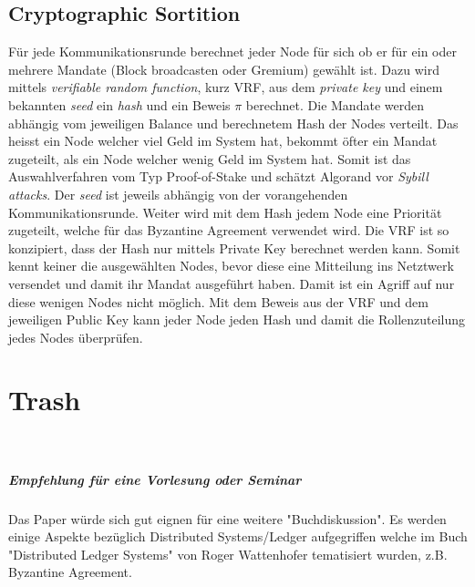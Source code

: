 \documentclass[11pt,a4paper]{article}
\begin{document}
\section*{Cryptographic Sortition}
F\"ur jede Kommunikationsrunde berechnet jeder Node f\"ur sich ob er f\"ur ein oder mehrere Mandate (Block broadcasten oder Gremium) gew\"ahlt ist.
Dazu wird mittels \textit{verifiable random function}, kurz VRF, aus dem \textit{private key} und einem bekannten \textit{seed} ein \textit{hash} und ein Beweis $\pi$ berechnet.
Die Mandate werden abh\"angig vom jeweiligen Balance und berechnetem Hash der Nodes verteilt.
Das heisst ein Node welcher viel Geld im System hat, bekommt \"ofter ein Mandat zugeteilt, als ein Node welcher wenig Geld im System hat.
Somit ist das Auswahlverfahren vom Typ Proof-of-Stake und schätzt Algorand vor \textit{Sybill attacks}.
Der \textit{seed} ist jeweils abh\"angig von der vorangehenden Kommunikationsrunde.
Weiter wird mit dem Hash jedem Node eine Priorit\"at zugeteilt, welche f\"ur das Byzantine Agreement verwendet wird.
Die VRF ist so konzipiert, dass der Hash nur mittels Private Key berechnet werden kann.
Somit kennt keiner die ausgew\"ahlten Nodes, bevor diese eine Mitteilung ins Netztwerk versendet und
damit ihr Mandat ausgef\"uhrt haben.
Damit ist ein Agriff auf nur diese wenigen Nodes nicht m\"oglich.
Mit dem Beweis aus der VRF und dem jeweiligen Public Key kann jeder Node jeden Hash und damit die Rollenzuteilung jedes Nodes \"uberpr\"ufen.

% 
{}



\newpage

\chapter{\textbf{\Large Trash}}\\

\paragraph*{Empfehlung f\"ur eine Vorlesung oder Seminar}
Das Paper \cite{Gilad:2017:ASB:3132747.3132757} w\"urde sich gut eignen f\"ur eine weitere "Buchdiskussion".
Es werden einige Aspekte bez\"uglich Distributed Systems/Ledger aufgegriffen welche
im Buch "Distributed Ledger Systems" von Roger Wattenhofer tematisiert wurden, z.B. Byzantine Agreement.
\end{document}
